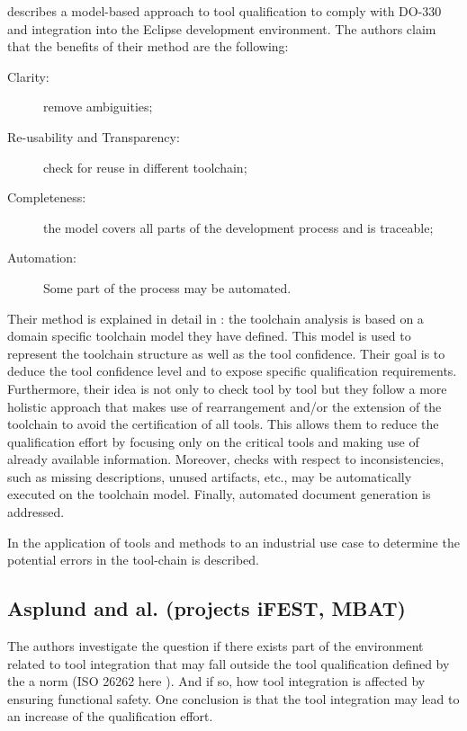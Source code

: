  \cite{slotosch_model-based_2012} describes a model-based approach to tool
 qualification to comply with DO-330 and integration into the Eclipse
 development environment. The authors claim that the benefits of their
 method  are the following:

\begin{description}
\item[Clarity:] remove ambiguities;
\item[Re-usability and Transparency:] check for reuse in different toolchain;
\item[Completeness:] the model covers all parts of the  development
  process and  is traceable;
\item[Automation:] Some part of the process may be automated.
\end{description}

Their method is explained in detail in \cite{slotosch_iso_2012}: the
toolchain analysis is based on a domain specific toolchain model
they have defined. This model is used to represent the toolchain
structure as well as the tool confidence.  Their goal is to deduce the
tool confidence level and to expose specific qualification
requirements. Furthermore, their idea is not only to check tool by
tool but they follow a more holistic approach that makes use of
rearrangement and/or the extension of the toolchain to avoid the
certification of all tools. This allows them to reduce the
qualification effort by focusing only on the critical tools and making
use of already available information.  Moreover, checks with respect to inconsistencies,
such as missing descriptions, unused artifacts, etc., may be
automatically executed on the toolchain model. Finally, automated document generation is addressed.

In \cite{wildmoser_determining_2012} the application of tools and methods to an
industrial use case to determine the potential errors in the tool-chain is described.

\subsection{Asplund and al. (projects iFEST, MBAT)}
\label{sec:asplund-approach}

The authors investigate the question if there exists part of the environment related to tool
integration that may fall outside the tool qualification defined by the a norm
(ISO 26262 here \cite{asplund_qualifying_2012}). And if so, how tool integration
is affected by ensuring functional safety. One conclusion is that the tool
integration may lead to an increase of the qualification effort.

